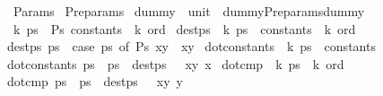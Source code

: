 %
\begin{isabellebody}%
%
%
\isadelimtheory
%
\endisadelimtheory
%
\isatagtheory
{}\isamarkupfalse%
\ Params\isanewline
{}\ Pre{\isacharunderscore}params\isanewline
{}%
\endisatagtheory
{\isafoldtheory}%
%
\isadelimtheory
\isanewline
%
\endisadelimtheory
\isanewline
\isanewline
{}\isamarkupfalse%
\ dummy\ {\isacharcolon}{\isacharcolon}\ {\isachardoublequoteopen}unit{\isachardoublequoteclose}\ \ {\isachardoublequoteopen}dummy{\isacharequal}Pre{\isacharunderscore}params{\isachardot}dummy{\isachardoublequoteclose}\isanewline
\isanewline
\isanewline
\isanewline
\isanewline
\isanewline
\isanewline
{}\isamarkupfalse%
\ {\isacharprime}k\ ps{}\ {\isacharequal}\ Ps{}\ {\isachardoublequoteopen}constants\ {\isacharasterisk}\ {\isacharprime}k\ ord{\isachardoublequoteclose}\isanewline
\isanewline
{}\isamarkupfalse%
\ dest{\isacharunderscore}ps{}\ {\isacharcolon}{\isacharcolon}\ {\isachardoublequoteopen}{\isacharprime}k\ ps{}\ {\isasymRightarrow}\ constants\ {\isacharasterisk}\ {\isacharprime}k\ ord{\isachardoublequoteclose}\ \isanewline
{\isachardoublequoteopen}dest{\isacharunderscore}ps{}\ ps{}\ {\isacharequal}\ {\isacharparenleft}case\ ps{}\ of\ Ps{}\ {\isacharparenleft}x{\isacharcomma}y{\isacharparenright}\ {\isasymRightarrow}\ {\isacharparenleft}x{\isacharcomma}y{\isacharparenright}{\isacharparenright}{\isachardoublequoteclose}\isanewline
\isanewline
\isanewline
\isanewline
\isanewline
\isanewline
{}\isamarkupfalse%
\ dot{\isacharunderscore}constants\ {\isacharcolon}{\isacharcolon}\ {\isachardoublequoteopen}{\isacharprime}k\ ps{}\ {\isasymRightarrow}\ constants{\isachardoublequoteclose}\ \isanewline
{\isachardoublequoteopen}dot{\isacharunderscore}constants\ ps{}\ {\isacharequal}\ ps{}\ {\isacharbar}{\isachargreater}\ dest{\isacharunderscore}ps{}\ {\isacharbar}{\isachargreater}\ {\isacharparenleft}{\isacharpercent}\ {\isacharparenleft}x{\isacharcomma}y{\isacharparenright}{\isachardot}\ x{\isacharparenright}{\isachardoublequoteclose}\isanewline
\isanewline
{}\isamarkupfalse%
\ dot{\isacharunderscore}cmp\ {\isacharcolon}{\isacharcolon}\ {\isachardoublequoteopen}{\isacharprime}k\ ps{}\ {\isasymRightarrow}\ {\isacharprime}k\ ord{\isachardoublequoteclose}\ \isanewline
{\isachardoublequoteopen}dot{\isacharunderscore}cmp\ ps{}\ {\isacharequal}\ ps{}\ {\isacharbar}{\isachargreater}\ dest{\isacharunderscore}ps{}\ {\isacharbar}{\isachargreater}\ {\isacharparenleft}{\isacharpercent}\ {\isacharparenleft}x{\isacharcomma}y{\isacharparenright}{\isachardot}\ y{\isacharparenright}{\isachardoublequoteclose}\isanewline
\isanewline
\isanewline
\isanewline
%
\isadelimtheory
\isanewline
%
\endisadelimtheory
%
\isatagtheory
{}\isamarkupfalse%
%
\endisatagtheory
{\isafoldtheory}%
%
\isadelimtheory
%
\endisadelimtheory
\end{isabellebody}%
